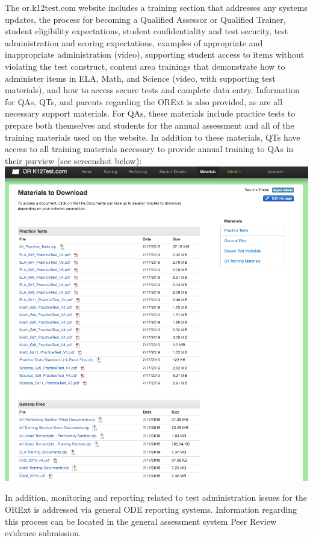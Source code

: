 \documentclass[]{article}
\begin{document}
The or.k12test.com website includes a training section that addresses
any systems updates, the process for becoming a Qualified Assessor or
Qualified Trainer, student eligibility expectations, student
confidentiality and test security, test administration and scoring
expectations, examples of appropriate and inappropriate administration
(video), supporting student access to items without violating the test
construct, content area trainings that demonstrate how to administer
items in ELA, Math, and Science (video, with supporting test materials),
and how to access secure tests and complete data entry. Information for
QAs, QTs, and parents regarding the ORExt is also provided, as are all
necessary support materials. For QAs, these materials include practice
tests to prepare both themselves and students for the annual assessment
and all of the training materials used on the website. In addition to
these materials, QTs have access to all training materials necessary to
provide annual training to QAs in their purview (see screenshot below):
\FloatBarrier 
\includegraphics{Figures/TrainingSite/MaterialsToDownload.png}

In addition, monitoring and reporting related to test administration
issues for the ORExt is addressed via general ODE reporting systems.
Information regarding this process can be located in the general
assessment system Peer Review evidence submission.
\end{document}
